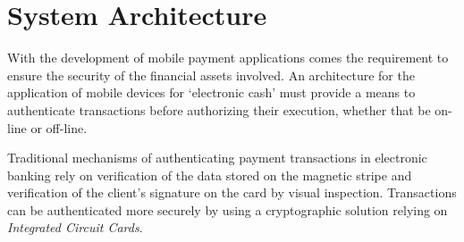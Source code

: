 \section{System Architecture}
\label{chap:hardware_architecture}
With the development of mobile payment applications comes the requirement to ensure the security of the financial assets involved.
An architecture for the application of mobile devices for `electronic cash' must provide a means to authenticate transactions before authorizing their execution, whether that be on-line or off-line.


Traditional mechanisms of authenticating payment transactions in electronic banking rely on verification of the data stored on the magnetic stripe and verification of the client's signature on the card by visual inspection.
Transactions can be authenticated more securely by using a cryptographic solution relying on \textit{Integrated Circuit Cards}.

